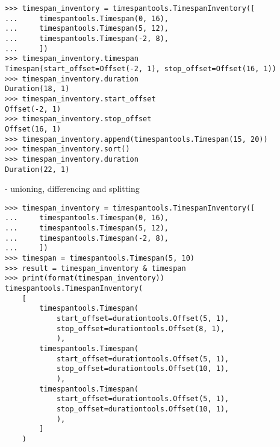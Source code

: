 \begin{comment}
<abjad>
timespan_inventory = timespantools.TimespanInventory([
    timespantools.Timespan(0, 16),
    timespantools.Timespan(5, 12),
    timespantools.Timespan(-2, 8),
    ])
timespan_inventory.timespan
timespan_inventory.duration
timespan_inventory.start_offset
timespan_inventory.stop_offset
timespan_inventory.append(timespantools.Timespan(15, 20))
timespan_inventory.sort()
timespan_inventory.duration
</abjad>
\end{comment}

\begin{singlespacing}
\begin{lstlisting}
>>> timespan_inventory = timespantools.TimespanInventory([
...     timespantools.Timespan(0, 16),
...     timespantools.Timespan(5, 12),
...     timespantools.Timespan(-2, 8),
...     ])
>>> timespan_inventory.timespan
Timespan(start_offset=Offset(-2, 1), stop_offset=Offset(16, 1))
>>> timespan_inventory.duration
Duration(18, 1)
>>> timespan_inventory.start_offset
Offset(-2, 1)
>>> timespan_inventory.stop_offset
Offset(16, 1)
>>> timespan_inventory.append(timespantools.Timespan(15, 20))
>>> timespan_inventory.sort()
>>> timespan_inventory.duration
Duration(22, 1)
\end{lstlisting}
\end{singlespacing}

- unioning, differencing and splitting

\begin{comment}
<abjad>
timespan_inventory = timespantools.TimespanInventory([
    timespantools.Timespan(0, 16),
    timespantools.Timespan(5, 12),
    timespantools.Timespan(-2, 8),
    ])
timespan = timespantools.Timespan(5, 10)
result = timespan_inventory & timespan
print(format(timespan_inventory))
</abjad>
\end{comment}

\begin{singlespacing}
\begin{lstlisting}
>>> timespan_inventory = timespantools.TimespanInventory([
...     timespantools.Timespan(0, 16),
...     timespantools.Timespan(5, 12),
...     timespantools.Timespan(-2, 8),
...     ])
>>> timespan = timespantools.Timespan(5, 10)
>>> result = timespan_inventory & timespan
>>> print(format(timespan_inventory))
timespantools.TimespanInventory(
    [
        timespantools.Timespan(
            start_offset=durationtools.Offset(5, 1),
            stop_offset=durationtools.Offset(8, 1),
            ),
        timespantools.Timespan(
            start_offset=durationtools.Offset(5, 1),
            stop_offset=durationtools.Offset(10, 1),
            ),
        timespantools.Timespan(
            start_offset=durationtools.Offset(5, 1),
            stop_offset=durationtools.Offset(10, 1),
            ),
        ]
    )
\end{lstlisting}
\end{singlespacing}


